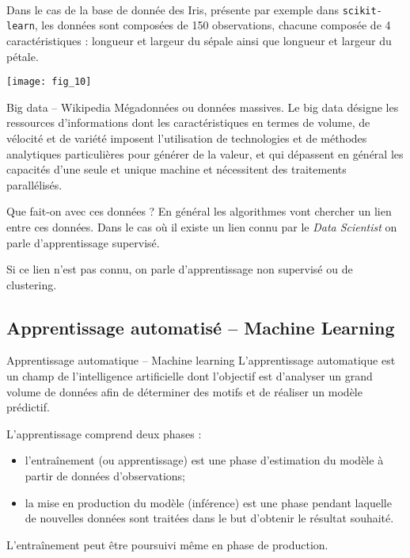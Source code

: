 \begin{exemple}~\\

\begin{minipage}[c]{.65\linewidth}
Dans le cas de la base de donnée des Iris, présente par exemple dans \texttt{scikit-learn}, les données sont composées de 150 observations, chacune composée de 4 caractéristiques : longueur et largeur du sépale ainsi que longueur et largeur du pétale.
\end{minipage} \hfill
\begin{minipage}[c]{.3\linewidth}
\begin{center}
\texttt{[image: fig\_10]}
\end{center}
\end{minipage} 

\end{exemple}


\begin{defi}{Big data -- Wikipedia}
Mégadonnées ou données massives. Le big data désigne les ressources d’informations dont les caractéristiques en termes de volume, de vélocité et de variété imposent l’utilisation de technologies et de méthodes analytiques particulières pour générer de la valeur, et qui dépassent en général les capacités d'une seule et unique machine et nécessitent des traitements parallélisés.
\end{defi}




Que fait-on avec ces données ? En général les algorithmes vont chercher un lien entre ces données. Dans le cas où il existe un lien connu par le \textit{Data Scientist} on parle d'apprentissage supervisé. 

Si ce lien n'est pas connu, on parle d'apprentissage non supervisé ou de clustering. 


\subsection{Apprentissage automatisé -- Machine Learning}



\begin{defi}{Apprentissage automatique -- Machine learning}
L'apprentissage automatique est un champ de l'intelligence artificielle dont l'objectif est d'analyser un grand volume de
données afin de déterminer des motifs et de réaliser un modèle prédictif. 

L'apprentissage comprend deux phases : 
\begin{itemize}
\item l’entraînement (ou apprentissage) est une phase d'estimation du modèle à partir de données d'observations; 
\item la mise en production du modèle (inférence) est une phase pendant laquelle de nouvelles données sont traitées dans le but d'obtenir le résultat souhaité. 
\end{itemize}

L’entraînement peut être poursuivi même en phase de production.

\end{defi}


